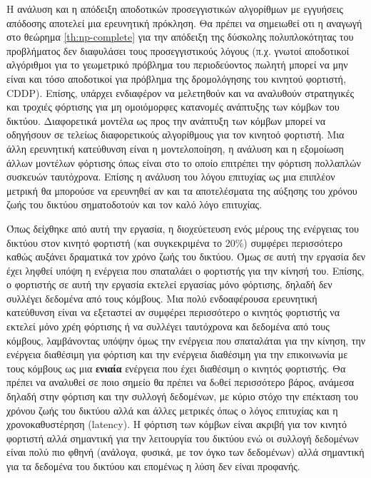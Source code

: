 Η ανάλυση και η απόδειξη αποδοτικών προσεγγιστικών αλγορίθμων με εγγυήσεις απόδοσης αποτελεί μια ερευνητική πρόκληση. Θα πρέπει να σημειωθεί οτι η αναγωγή στο
θεώρημα \ref{th:np-complete} για την απόδειξη της δύσκολης πολυπλοκότητας του προβλήματος δεν διαφυλάσει τους προσεγγιστικούς λόγους (π.χ. γνωτοί αποδοτικοί
αλγόριθμοι για το γεωμετρικό πρόβλημα του περιοδεύοντος πωλητή μπορεί να μην είναι και τόσο αποδοτικοί για πρόβλημα της δρομολόγησης του κινητού φορτιστή, CDDP).
Επίσης, υπάρχει ενδιαφέρον να μελετηθούν και να αναλυθούν στρατηγικές και τροχιές φόρτισης για μη ομοιόμορφες κατανομές ανάπτυξης των κόμβων του δικτύου. Διαφορετικά
μοντέλα ως προς την ανάπτυξη των κόμβων μπορεί να οδηγήσουν σε τελείως διαφορετικούς αλγορίθμους για τον κινητοό φορτιστή. Μια άλλη ερευνητική κατεύθυνση είναι
η μοντελοποίηση, η ανάλυση και η εξομοίωση άλλων μοντέλων φόρτισης όπως είναι στο \cite{multiple_devices} το οποίο επιτρέπει την φόρτιση πολλαπλών συσκευών
ταυτόχρονα. Επίσης η ανάλυση του λόγου επιτυχίας ως μια επιπλέον μετρική θα μπορούσε να ερευνηθεί αν και τα αποτελέσματα της αύξησης του χρόνου ζωής του δικτύου
σηματοδοτούν και τον καλό λόγο επιτυχίας.


Όπως δείχθηκε από αυτή την εργασία, η διοχεύετευση ενός μέρους της ενέργειας του δικτύου στον κινητό φορτιστή (και συγκεκριμένα το 20\%) συμφέρει περισσότερο καθώς
αυξάνει δραματικά τον χρόνο ζωής του δικτύου. Όμως σε αυτή την εργασία δεν έχει ληφθεί υπόψη η ενέργεια που σπαταλάει ο φορτιστής για την κίνησή του. Επίσης, ο
φορτιστής σε αυτή την εργασία εκτελεί εργασίας μόνο φόρτισης, δηλαδή δεν συλλέγει δεδομένα από τους κόμβους. Μια πολύ ενδοαφέρουσα ερευνητική κατεύθυνση είναι να
εξεταστεί αν συμφέρει περισσότερο ο κινητός φορτιστής να εκτελεί μόνο χρέη φόρτισης ή να συλλέγει ταυτόχρονα και δεδομένα από τους κόμβους, λαμβάνοντας υπόψην όμως
την ενέργεια που σπαταλάται για την κίνηση, την ενέργεια διαθέσιμη για φόρτιση και την ενέργεια διαθέσιμη για την επικοινωνία με τους κόμβους ως μια \textbf{ενιαία}
ενέργεια που έχει διαθέσιμη ο κινητός φορτιστής. Θα πρέπει να αναλυθεί σε ποιο σημείο θα πρέπει να δoθεί περισσότερο βάρος, ανάμεσα δηλαδή στην φόρτιση και την
συλλογή δεδομένων, με κύριο στόχο την επέκταση του χρόνου ζωής του δικτύου αλλά και άλλες μετρικές όπως ο λόγος επιτυχίας και η χρονοκαθυστέρηση (latency). Η φόρτιση
των κόμβων είναι ακριβή για τον κινητό φορτιστή αλλά σημαντική για την λειτουργία του δικτύου ενώ οι συλλογή δεδομένων είναι πολύ πιο φθηνή (ανάλογα, φυσικά, με τον
όγκο των δεδομένων) αλλά σημαντική για τα δεδομένα του δικτύου και επομένως η λύση δεν είναι προφανής.
